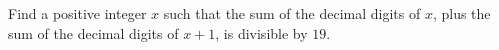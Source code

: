 Find a positive integer $x$ such that the sum of the decimal digits of $x$, plus the sum of the decimal digits of $x+1$, is divisible by $19$.
